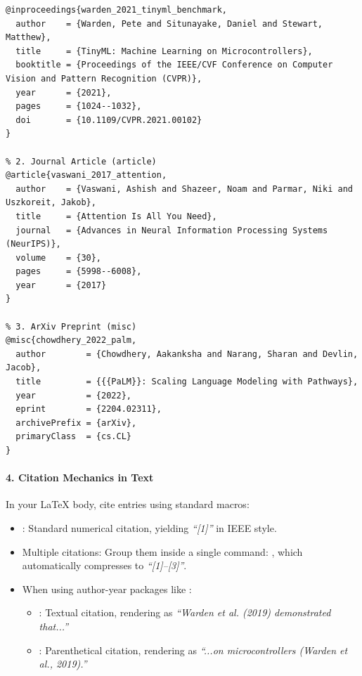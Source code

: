 \begin{lstlisting}[style=pythonstyle, caption={Standard Bib\TeX{} Entries for Conference, Journal, and Preprint Sources.}, label={lst:bib_examples}]
% 1. Conference Paper (inproceedings)
@inproceedings{warden_2021_tinyml_benchmark,
  author    = {Warden, Pete and Situnayake, Daniel and Stewart, Matthew},
  title     = {TinyML: Machine Learning on Microcontrollers},
  booktitle = {Proceedings of the IEEE/CVF Conference on Computer Vision and Pattern Recognition (CVPR)},
  year      = {2021},
  pages     = {1024--1032},
  doi       = {10.1109/CVPR.2021.00102}
}

% 2. Journal Article (article)
@article{vaswani_2017_attention,
  author    = {Vaswani, Ashish and Shazeer, Noam and Parmar, Niki and Uszkoreit, Jakob},
  title     = {Attention Is All You Need},
  journal   = {Advances in Neural Information Processing Systems (NeurIPS)},
  volume    = {30},
  pages     = {5998--6008},
  year      = {2017}
}

% 3. ArXiv Preprint (misc)
@misc{chowdhery_2022_palm,
  author        = {Chowdhery, Aakanksha and Narang, Sharan and Devlin, Jacob},
  title         = {{{PaLM}}: Scaling Language Modeling with Pathways},
  year          = {2022},
  eprint        = {2204.02311},
  archivePrefix = {arXiv},
  primaryClass  = {cs.CL}
}
\end{lstlisting}

\paragraph{4. Citation Mechanics in Text}
In your \LaTeX{} body, cite entries using standard macros:
\begin{itemize}
    \item {}: Standard numerical citation, yielding \emph{``[1]''} in IEEE style.
    \item Multiple citations: Group them inside a single command: , which automatically compresses to \emph{``[1]--[3]''}.
    \item When using author-year packages like :
    \begin{itemize}
        \item {}: Textual citation, rendering as \emph{``Warden et al. (2019) demonstrated that...''}
        \item {}: Parenthetical citation, rendering as \emph{``...on microcontrollers (Warden et al., 2019).''}
    \end{itemize}
\end{itemize}

